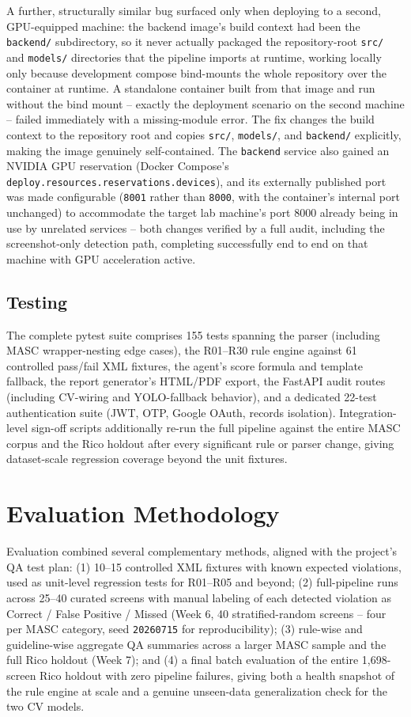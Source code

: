 \documentclass[10pt,conference]{IEEEtran}
\begin{document}
A further, structurally similar bug surfaced only when deploying to a second, GPU-equipped machine: the backend image's build context had been the \texttt{backend/} subdirectory, so it never actually packaged the repository-root \texttt{src/} and \texttt{models/} directories that the pipeline imports at runtime, working locally only because development compose bind-mounts the whole repository over the container at runtime. A standalone container built from that image and run without the bind mount -- exactly the deployment scenario on the second machine -- failed immediately with a missing-module error. The fix changes the build context to the repository root and copies \texttt{src/}, \texttt{models/}, and \texttt{backend/} explicitly, making the image genuinely self-contained. The \texttt{backend} service also gained an NVIDIA GPU reservation (Docker Compose's \texttt{deploy.resources.reservations.devices}), and its externally published port was made configurable (\texttt{8001} rather than \texttt{8000}, with the container's internal port unchanged) to accommodate the target lab machine's port 8000 already being in use by unrelated services -- both changes verified by a full audit, including the screenshot-only detection path, completing successfully end to end on that machine with GPU acceleration active.

\subsection{Testing}
The complete pytest suite comprises 155 tests spanning the parser (including MASC wrapper-nesting edge cases), the R01--R30 rule engine against 61 controlled pass/fail XML fixtures, the agent's score formula and template fallback, the report generator's HTML/PDF export, the FastAPI audit routes (including CV-wiring and YOLO-fallback behavior), and a dedicated 22-test authentication suite (JWT, OTP, Google OAuth, records isolation). Integration-level sign-off scripts additionally re-run the full pipeline against the entire MASC corpus and the Rico holdout after every significant rule or parser change, giving dataset-scale regression coverage beyond the unit fixtures.

\section{Evaluation Methodology}

Evaluation combined several complementary methods, aligned with the project's QA test plan: (1) 10--15 controlled XML fixtures with known expected violations, used as unit-level regression tests for R01--R05 and beyond; (2) full-pipeline runs across 25--40 curated screens with manual labeling of each detected violation as Correct / False Positive / Missed (Week 6, 40 stratified-random screens -- four per MASC category, seed \texttt{20260715} for reproducibility); (3) rule-wise and guideline-wise aggregate QA summaries across a larger MASC sample and the full Rico holdout (Week 7); and (4) a final batch evaluation of the entire 1{,}698-screen Rico holdout with zero pipeline failures, giving both a health snapshot of the rule engine at scale and a genuine unseen-data generalization check for the two CV models.
\end{document}
